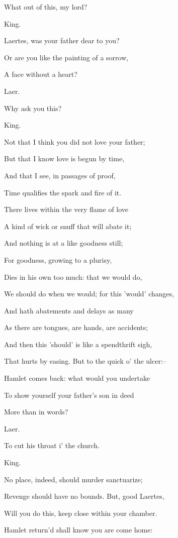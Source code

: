 \documentclass[12pt]{book}
\begin{document}
What out of this, my lord?



King.

Laertes, was your father dear to you?

Or are you like the painting of a sorrow,

A face without a heart?



Laer.

Why ask you this?



King.

Not that I think you did not love your father;

But that I know love is begun by time,

And that I see, in passages of proof,

Time qualifies the spark and fire of it.

There lives within the very flame of love

A kind of wick or snuff that will abate it;

And nothing is at a like goodness still;

For goodness, growing to a plurisy,

Dies in his own too much: that we would do,

We should do when we would; for this 'would' changes,

And hath abatements and delays as many

As there are tongues, are hands, are accidents;

And then this 'should' is like a spendthrift sigh,

That hurts by easing. But to the quick o' the ulcer:--

Hamlet comes back: what would you undertake

To show yourself your father's son in deed

More than in words?



Laer.

To cut his throat i' the church.



King.

No place, indeed, should murder sanctuarize;

Revenge should have no bounds. But, good Laertes,

Will you do this, keep close within your chamber.

Hamlet return'd shall know you are come home:
\end{document}
